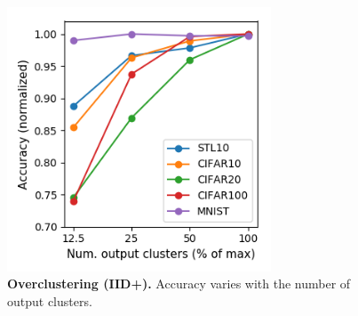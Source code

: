 \begin{figure}[h]
\centering
\includegraphics[width=0.7\textwidth]{experiments2_files/render_vary_num_clusters.png}
\caption{\textbf{Overclustering (IID+).} Accuracy varies with the number of output clusters.} \label{f:imgclus_num_clusters}
\end{figure}